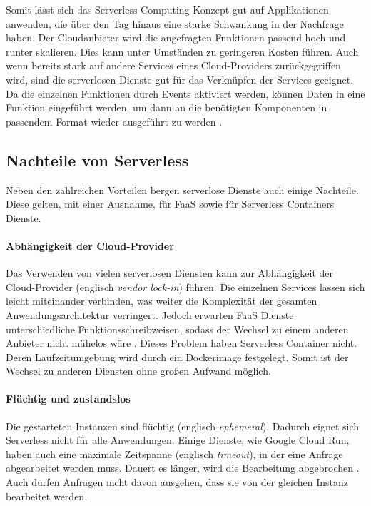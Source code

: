 Somit lässt sich das Serverless-Computing Konzept gut auf Applikationen anwenden,
die über den Tag hinaus eine starke Schwankung in der Nachfrage haben. Der Cloudanbieter wird
die angefragten Funktionen passend hoch und runter skalieren.
Dies kann unter Umständen zu geringeren Kosten führen.
Auch wenn bereits stark auf andere Services eines Cloud-Providers
zurückgegriffen wird, sind die serverlosen Dienste
gut für das Verknüpfen der Services geeignet. Da die einzelnen Funktionen durch Events
aktiviert werden, können Daten in eine Funktion eingeführt werden, um
dann an die benötigten Komponenten in passendem Format wieder ausgeführt zu werden
\cite{ServerlessTrends} \cite{HpcServerless}.

\subsection{Nachteile von Serverless}
Neben den zahlreichen Vorteilen bergen serverlose Dienste auch einige Nachteile.
Diese gelten, mit einer Ausnahme, für FaaS sowie für
Serverless Containers Dienste.

\paragraph{Abhängigkeit der Cloud-Provider} Das Verwenden von vielen serverlosen Diensten kann zur Abhängigkeit der
Cloud-Provider (englisch \emph{vendor lock-in}) führen. Die einzelnen
Services lassen sich leicht miteinander verbinden,
was weiter die Komplexität der gesamten Anwendungsarchitektur verringert. Jedoch erwarten
FaaS Dienste unterschiedliche Funktionsschreibweisen, sodass der Wechsel zu einem
anderen Anbieter nicht mühelos wäre \cite{EcoArc}.
Dieses Problem haben Serverless Container nicht.
Deren Laufzeitumgebung wird durch ein Dockerimage festgelegt.
Somit ist der Wechsel zu anderen Diensten ohne großen Aufwand
möglich.

\paragraph{Flüchtig und zustandslos} Die gestarteten Instanzen sind flüchtig (englisch \emph{ephemeral}). Dadurch
eignet sich Serverless nicht für alle Anwendungen. Einige Dienste, wie Google Cloud Run,
haben auch eine maximale Zeitspanne (englisch \emph{timeout}), in der eine Anfrage abgearbeitet werden muss.
Dauert es länger, wird die Bearbeitung abgebrochen \cite{CloudRunTimeout}.
Auch dürfen Anfragen nicht davon ausgehen, dass sie von der
gleichen Instanz bearbeitet werden.

